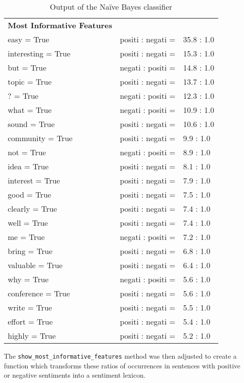 \begin{table}[htbp!]
\caption{Output of the Na\"ive Bayes classifier}\label{tab:nbc_output}
\centering
\begin{tabular}{lll}
\textbf{Most Informative Features} & \textbf{}         & \textbf{}  \\
easy = True                        & positi : negati = & 35.8 : 1.0 \\
interesting = True                 & positi : negati = & 15.3 : 1.0 \\
but = True                         & negati : positi = & 14.8 : 1.0 \\
topic = True                       & positi : negati = & 13.7 : 1.0 \\
? = True                           & negati : positi = & 12.3 : 1.0 \\
what = True                        & negati : positi = & 10.9 : 1.0 \\
sound = True                       & positi : negati = & 10.6 : 1.0 \\
community = True                   & positi : negati = & 9.9 : 1.0  \\
not = True                         & negati : positi = & 8.9 : 1.0  \\
idea = True                        & positi : negati = & 8.1 : 1.0  \\
interest = True                    & positi : negati = & 7.9 : 1.0  \\
good = True                        & positi : negati = & 7.5 : 1.0  \\
clearly = True                     & positi : negati = & 7.4 : 1.0  \\
well = True                        & positi : negati = & 7.4 : 1.0  \\
me = True                          & negati : positi = & 7.2 : 1.0  \\
bring = True                       & positi : negati = & 6.8 : 1.0  \\
valuable = True                    & positi : negati = & 6.4 : 1.0  \\
why = True                         & negati : positi = & 5.6 : 1.0  \\
conference = True                  & positi : negati = & 5.6 : 1.0  \\
write = True                       & positi : negati = & 5.5 : 1.0  \\
effort = True                      & positi : negati = & 5.4 : 1.0  \\
highly = True                      & positi : negati = & 5.2 : 1.0 
\end{tabular}
\end{table}
The \texttt{show\_most\_informative\_features} method was then adjusted to create a function which transforms these ratios of occurrences in sentences with positive or negative sentiments into a sentiment lexicon. 

